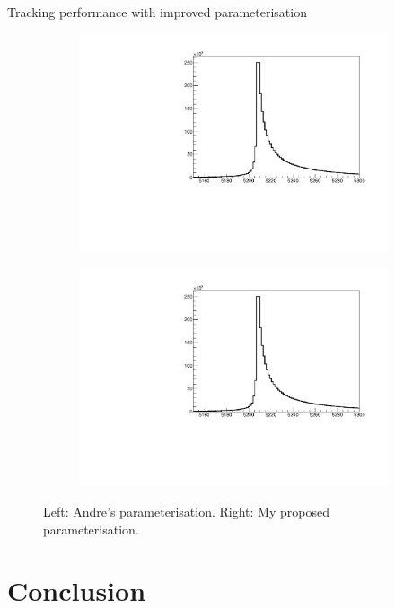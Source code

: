 \documentclass[xcolor={dvipsnames}]{beamer}
\begin{document}
\begin{frame}{Tracking performance with improved parameterisation}
\begin{figure}[htb]
\begin{subfigure}{0.4\textwidth}
      \includegraphics[width=1\textwidth]{Plots/z_mag_distribution_new_parameterisation.pdf}
    \end{subfigure}%
    \begin{subfigure}{0.4\textwidth}
      \includegraphics[width=1\textwidth]{Plots/z_mag_distribution_new_parameterisation.pdf}
    \end{subfigure}
    \vspace{-0.3cm}
    \caption*{Left: Andre's parameterisation. Right: My proposed parameterisation.}
  \end{figure}
\end{frame}

\section{Conclusion}
\end{document}
